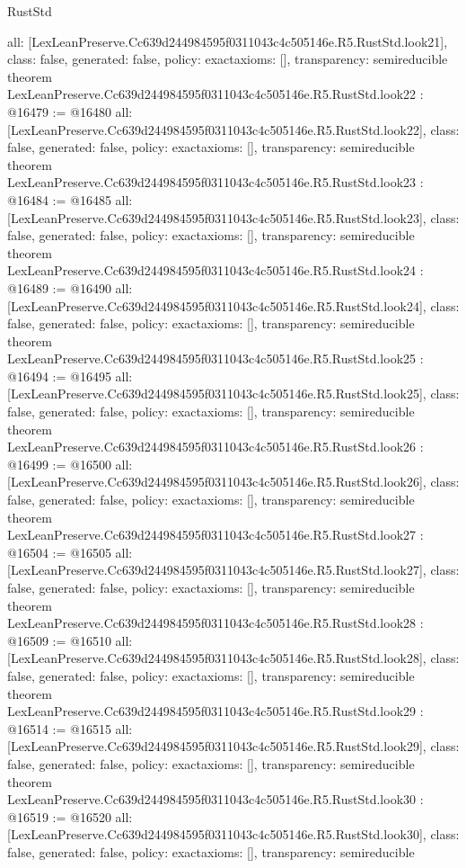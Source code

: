 \begin{lexlean}{RustStd}
\begin{coremodule}
{  all: [LexLeanPreserve.Cc639d244984595f0311043c4c505146e.R5.RustStd.look21],
  class: false,
  generated: false,
  policy: exact{axioms: []},
  transparency: semireducible
}
theorem LexLeanPreserve.Cc639d244984595f0311043c4c505146e.R5.RustStd.look22 : @16479 := @16480 {
  all: [LexLeanPreserve.Cc639d244984595f0311043c4c505146e.R5.RustStd.look22],
  class: false,
  generated: false,
  policy: exact{axioms: []},
  transparency: semireducible
}
theorem LexLeanPreserve.Cc639d244984595f0311043c4c505146e.R5.RustStd.look23 : @16484 := @16485 {
  all: [LexLeanPreserve.Cc639d244984595f0311043c4c505146e.R5.RustStd.look23],
  class: false,
  generated: false,
  policy: exact{axioms: []},
  transparency: semireducible
}
theorem LexLeanPreserve.Cc639d244984595f0311043c4c505146e.R5.RustStd.look24 : @16489 := @16490 {
  all: [LexLeanPreserve.Cc639d244984595f0311043c4c505146e.R5.RustStd.look24],
  class: false,
  generated: false,
  policy: exact{axioms: []},
  transparency: semireducible
}
theorem LexLeanPreserve.Cc639d244984595f0311043c4c505146e.R5.RustStd.look25 : @16494 := @16495 {
  all: [LexLeanPreserve.Cc639d244984595f0311043c4c505146e.R5.RustStd.look25],
  class: false,
  generated: false,
  policy: exact{axioms: []},
  transparency: semireducible
}
theorem LexLeanPreserve.Cc639d244984595f0311043c4c505146e.R5.RustStd.look26 : @16499 := @16500 {
  all: [LexLeanPreserve.Cc639d244984595f0311043c4c505146e.R5.RustStd.look26],
  class: false,
  generated: false,
  policy: exact{axioms: []},
  transparency: semireducible
}
theorem LexLeanPreserve.Cc639d244984595f0311043c4c505146e.R5.RustStd.look27 : @16504 := @16505 {
  all: [LexLeanPreserve.Cc639d244984595f0311043c4c505146e.R5.RustStd.look27],
  class: false,
  generated: false,
  policy: exact{axioms: []},
  transparency: semireducible
}
theorem LexLeanPreserve.Cc639d244984595f0311043c4c505146e.R5.RustStd.look28 : @16509 := @16510 {
  all: [LexLeanPreserve.Cc639d244984595f0311043c4c505146e.R5.RustStd.look28],
  class: false,
  generated: false,
  policy: exact{axioms: []},
  transparency: semireducible
}
theorem LexLeanPreserve.Cc639d244984595f0311043c4c505146e.R5.RustStd.look29 : @16514 := @16515 {
  all: [LexLeanPreserve.Cc639d244984595f0311043c4c505146e.R5.RustStd.look29],
  class: false,
  generated: false,
  policy: exact{axioms: []},
  transparency: semireducible
}
theorem LexLeanPreserve.Cc639d244984595f0311043c4c505146e.R5.RustStd.look30 : @16519 := @16520 {
  all: [LexLeanPreserve.Cc639d244984595f0311043c4c505146e.R5.RustStd.look30],
  class: false,
  generated: false,
  policy: exact{axioms: []},
  transparency: semireducible
}
\end{coremodule}
\end{lexlean}
